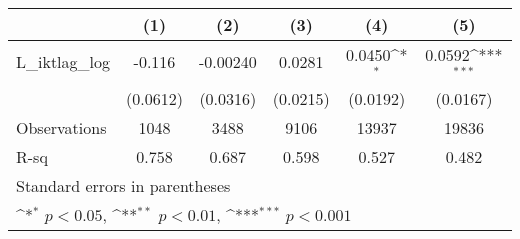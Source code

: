 {
\def\sym#1{\ifmmode^{#1}\else\(^{#1}\)\fi}
\begin{tabular}{l*{5}{c}}
\hline\hline
                &\multicolumn{1}{c}{(1)}         &\multicolumn{1}{c}{(2)}         &\multicolumn{1}{c}{(3)}         &\multicolumn{1}{c}{(4)}         &\multicolumn{1}{c}{(5)}         \\
\hline
L\_iktlag\_log    &   -0.116         & -0.00240         &   0.0281         &   0.0450\sym{*}  &   0.0592\sym{***}\\
                & (0.0612)         & (0.0316)         & (0.0215)         & (0.0192)         & (0.0167)         \\
\hline
Observations    &     1048         &     3488         &     9106         &    13937         &    19836         \\
R-sq            &    0.758         &    0.687         &    0.598         &    0.527         &    0.482         \\
\hline\hline
\multicolumn{6}{l}{\footnotesize Standard errors in parentheses}\\
\multicolumn{6}{l}{\footnotesize \sym{*} \(p<0.05\), \sym{**} \(p<0.01\), \sym{***} \(p<0.001\)}\\
\end{tabular}
}
